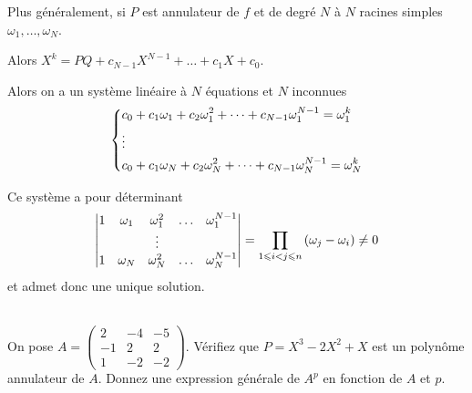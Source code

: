 \begin{rem}
Plus généralement, si \(P\) est annulateur de \(f\) et de degré \(N\) à \(N\) racines simples \(\omega_1,\dots,\omega_N\).

Alors \(X^k=PQ+c_{N-1}X^{N-1}+\dots+c_1X+c_0\).

Alors on a un système linéaire à \(N\) équations et \(N\) inconnues \[\begin{dcases}
c_0+c_1\omega_1+c_2\omega_1^2+\dots+c_{N-1}\omega_1^{N-1}=\omega_1^k \\
\vdots \\
c_0+c_1\omega_N+c_2\omega_N^2+\dots+c_{N-1}\omega_N^{N-1}=\omega_N^k
\end{dcases}\]

Ce système a pour déterminant \[\begin{vmatrix}
1 & \omega_1 & \omega_1^2 & \dots & \omega_1^{N-1} \\
 & & \vdots & & \\
1 & \omega_N & \omega_N^2 & \dots & \omega_N^{N-1}
\end{vmatrix}=\prod_{1\leqslant i<j\leqslant n}\left(\omega_j-\omega_i\right)\not=0\] et admet donc une unique solution.
\end{rem}

\begin{exo}~\\
On pose \(A=\begin{pmatrix}
2 & -4 & -5 \\
-1 & 2 & 2 \\
1 & -2 & -2
\end{pmatrix}\). Vérifiez que \(P=X^3-2X^2+X\) est un polynôme annulateur de \(A\). Donnez une expression générale de \(A^p\) en fonction de \(A\) et \(p\).
\end{exo}

